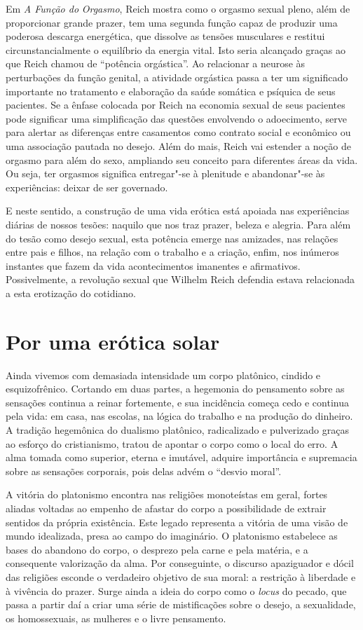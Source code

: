 Em \emph{A Função do} \emph{Orgasmo}, Reich mostra como o orgasmo sexual
pleno, além de proporcionar grande prazer, tem uma segunda função capaz
de produzir uma poderosa descarga energética, que dissolve as tensões
musculares e restitui circunstancialmente o equilíbrio da energia vital.
Isto seria alcançado graças ao que Reich chamou de ``potência
orgástica''. Ao relacionar a neurose às perturbações da função genital,
a atividade orgástica passa a ter um significado importante no
tratamento e elaboração da saúde somática e psíquica de seus pacientes.
Se a ênfase colocada por Reich na economia sexual de seus pacientes pode
significar uma simplificação das questões envolvendo o adoecimento,
serve para alertar as diferenças entre casamentos como contrato social e
econômico ou uma associação pautada no desejo. Além do mais, Reich vai
estender a noção de orgasmo para além do sexo, ampliando seu conceito
para diferentes áreas da vida. Ou seja, ter orgasmos significa
entregar"-se à plenitude e abandonar"-se às experiências: deixar de ser
governado.

E neste sentido, a construção de uma vida erótica está apoiada nas
experiências diárias de nossos tesões: naquilo que nos traz prazer,
beleza e alegria. Para além do tesão como desejo sexual, esta potência
emerge nas amizades, nas relações entre pais e filhos, na relação com o
trabalho e a criação, enfim, nos inúmeros instantes que fazem da vida
acontecimentos imanentes e afirmativos. Possivelmente, a revolução
sexual que Wilhelm Reich defendia estava relacionada a esta erotização
do cotidiano.

\section{Por uma erótica solar}

Ainda vivemos com demasiada intensidade um corpo platônico, cindido e
esquizofrênico. Cortando em duas partes, a hegemonia do pensamento sobre
as sensações continua a reinar fortemente, e sua incidência começa cedo
e continua pela vida: em casa, nas escolas, na lógica do trabalho e na
produção do dinheiro. A tradição hegemônica do dualismo platônico,
radicalizado e pulverizado graças ao esforço do cristianismo, tratou de
apontar o corpo como o local do erro. A alma tomada como superior,
eterna e imutável, adquire importância e supremacia sobre as sensações
corporais, pois delas advém o ``desvio moral''.

A vitória do platonismo encontra nas religiões monoteístas em geral,
fortes aliadas voltadas ao empenho de afastar do corpo a possibilidade
de extrair sentidos da própria existência. Este legado representa a
vitória de uma visão de mundo idealizada, presa ao campo do imaginário.
O platonismo estabelece as bases do abandono do corpo, o desprezo pela
carne e pela matéria, e a consequente valorização da alma. Por
conseguinte, o discurso apaziguador e dócil das religiões esconde o
verdadeiro objetivo de sua moral: a restrição à liberdade e à vivência
do prazer. Surge ainda a ideia do corpo como o \emph{locus} do pecado,
que passa a partir daí a criar uma série de mistificações sobre o
desejo, a sexualidade, os homossexuais, as mulheres e o livre
pensamento.

